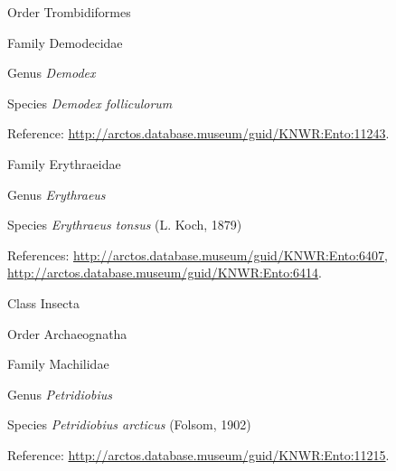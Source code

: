 \documentclass[9pt, article]{memoir}
\begin{document}
\begin{multicols}{2}
\vspace{6pt}\noindent\hspace{18pt}Order Trombidiformes


\vspace{6pt}\noindent\hspace{24pt}Family Demodecidae


\vspace{6pt}\noindent\hspace{30pt}Genus \textit{Demodex}


\vspace{6pt}\noindent\hspace{36pt}Species \textit{Demodex folliculorum}


\vspace{6pt}Reference: 
\url{http://arctos.database.museum/guid/KNWR:Ento:11243}.

\vspace{6pt}\noindent\hspace{24pt}Family Erythraeidae


\vspace{6pt}\noindent\hspace{30pt}Genus \textit{Erythraeus}


\vspace{6pt}\noindent\hspace{36pt}Species \textit{Erythraeus tonsus} (L. Koch, 1879)


\vspace{6pt}References: 
\url{http://arctos.database.museum/guid/KNWR:Ento:6407}, 
\url{http://arctos.database.museum/guid/KNWR:Ento:6414}.

\vspace{6pt}\noindent\hspace{12pt}Class Insecta


\vspace{6pt}\noindent\hspace{18pt}Order Archaeognatha


\vspace{6pt}\noindent\hspace{24pt}Family Machilidae


\vspace{6pt}\noindent\hspace{30pt}Genus \textit{Petridiobius}


\vspace{6pt}\noindent\hspace{36pt}Species \textit{Petridiobius arcticus} (Folsom, 1902)


\vspace{6pt}Reference: 
\url{http://arctos.database.museum/guid/KNWR:Ento:11215}.


\end{multicols}
\end{document}
